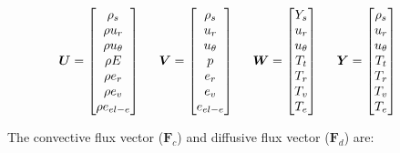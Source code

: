\documentclass[10pt]{article}
\begin{document}
\begin{flushleft}
\begin{equation*}
    \boldsymbol{U} = \begin{bmatrix}
        \rho_s \\
        \rho u_r \\
        \rho u_\theta \\
        \rho E \\
        \rho e_r \\
        \rho e_v \\
        \rho e_{el-e}
    \end{bmatrix}
    \hspace{5mm} 
    \boldsymbol{V} = \begin{bmatrix}
        \rho_s \\
        u_r \\
        u_\theta \\
        p \\
        e_r \\
        e_v \\ 
        e_{el-e} \\
    \end{bmatrix}
    \hspace{5mm} 
    \boldsymbol{W} = \begin{bmatrix}
        Y_s \\
        u_r \\
        u_\theta \\
        T_{t} \\
        T_{r} \\
        T_{v} \\ 
        T_{e} 
    \end{bmatrix}
    \hspace{5mm} 
    \boldsymbol{Y} = \begin{bmatrix}
        \rho_s \\
        u_r \\
        u_\theta \\
        T_{t} \\
        T_{r} \\
        T_{v} \\
        T_{e}
    \end{bmatrix}
    \hspace{5mm} 
\end{equation*}

The convective flux vector ($\boldsymbol{F}_c$) and diffusive flux vector ($\boldsymbol{F}_d$) are:


\end{flushleft}
\end{document}
